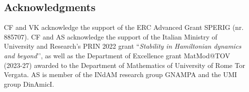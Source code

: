 \documentclass[12pt, openany]{amsart}
\theoremstyle{definition}
\theoremstyle{remark}
\theoremstyle{remark}
\theoremstyle{theorem}
\theoremstyle{theorem}
\theoremstyle{theorem}
\theoremstyle{theorem}
\begin{document}
\medskip


\subsection{Acknowledgments} 
CF and VK acknowledge the support of the ERC Advanced Grant SPERIG (nr. 885707).
CF and AS  acknowledge the support of the Italian Ministry of University and Research’s  PRIN 2022 grant ``{\it Stability in Hamiltonian dynamics and beyond}’', as well as the Department of Excellence grant MatMod@TOV (2023-27) awarded to the Department of Mathematics of University of Rome Tor Vergata. 
AS is member of the INdAM research group GNAMPA and the UMI group DinAmicI.




\usetikzlibrary{decorations.markings}
\usetikzlibrary{decorations.pathreplacing}
\end{document}
